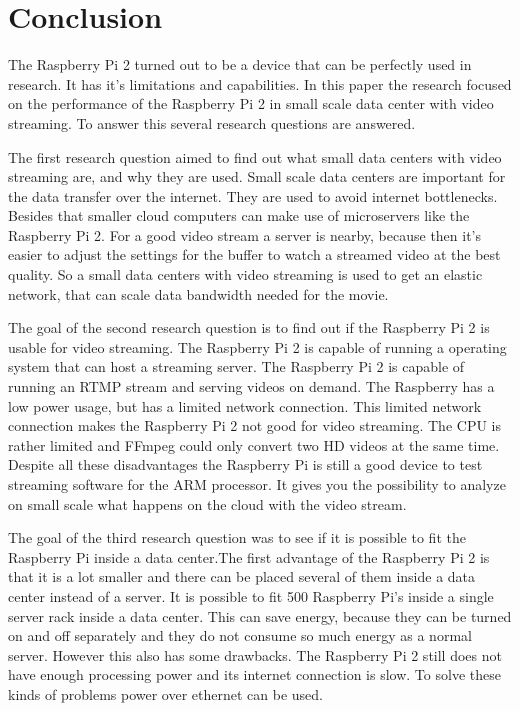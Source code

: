 \documentclass{sig-alternate-br}
\begin{document}
\section{Conclusion}
The Raspberry Pi 2 turned out to be a device that can be perfectly used in research. It has it's limitations and capabilities. In this paper the research focused on the performance of the Raspberry Pi 2 in small scale data center with video streaming. To answer this several research questions are answered.

The first research question aimed to find out what small data centers with video streaming are, and why they are used. Small scale data centers are important for the data transfer over the internet. They are used to avoid internet bottlenecks. Besides that smaller cloud computers can make use of microservers like the Raspberry Pi 2. For a good video stream a server is nearby, because then it's easier to adjust the settings for the buffer to watch a streamed video at the best quality. So a small data centers with video streaming is used to get an elastic network, that can scale data bandwidth needed for the movie. 

The goal of the second research question is to find out if the Raspberry Pi 2 is usable for video streaming. The Raspberry Pi 2 is capable of running a operating system that can host a streaming server. The Raspberry Pi 2 is capable of running an RTMP stream and serving videos on demand. The Raspberry has a low power usage, but has a limited network connection. This limited network connection makes the Raspberry Pi 2 not good for video streaming. The CPU is rather limited and FFmpeg could only convert two HD videos at the same time. Despite all these disadvantages the Raspberry Pi is still a good device to test streaming software for the ARM processor. It gives you the possibility to analyze on small scale what happens on the cloud with the video stream.

The goal of the third research question was to see if it is possible to fit the Raspberry Pi inside a data center.The first advantage of the Raspberry Pi 2 is that it is a lot smaller and there can be placed several of them inside a data center instead of a server. It is possible to fit 500 Raspberry Pi's inside a single server rack inside a data center. This can save energy, because they can be turned on and off separately and they do not consume so much energy as a normal server. However this also has some drawbacks. The Raspberry Pi 2 still does not have enough processing power and its internet connection is slow. To solve these kinds of problems power over ethernet can be used. 
	
\end{document}
